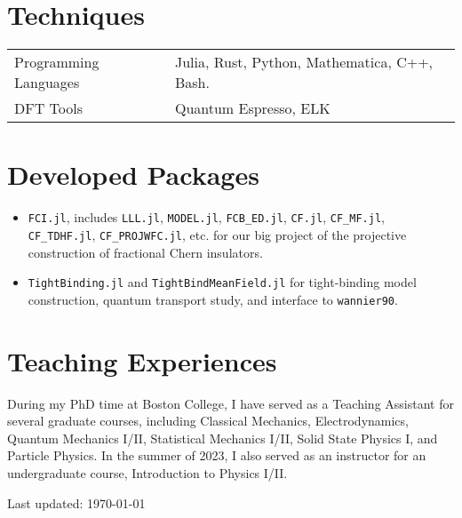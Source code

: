 \documentclass[10pt, letterpaper]{article}
\begin{document}
\section*{Techniques}
\begin{tabular}{ll}
    Programming Languages & Julia, Rust, Python, Mathematica, C++, Bash. \\
    DFT Tools             & Quantum Espresso, ELK                        \\
\end{tabular}

\section*{Developed Packages}
\begin{itemize}
    \item \texttt{FCI.jl}, includes \texttt{LLL.jl}, \texttt{MODEL.jl}, \texttt{FCB\_ED.jl}, \texttt{CF.jl}, \texttt{CF\_MF.jl}, \texttt{CF\_TDHF.jl}, \texttt{CF\_PROJWFC.jl}, etc. for our big project of the projective construction of fractional Chern insulators.
    \item \texttt{TightBinding.jl} and \texttt{TightBindMeanField.jl} for tight-binding model construction, quantum transport study, and interface to \texttt{wannier90}.
\end{itemize}



\section*{Teaching Experiences}
During my PhD time at Boston College, I have served as a Teaching Assistant for several graduate courses, including Classical Mechanics, Electrodynamics, Quantum Mechanics I/II, Statistical Mechanics I/II, Solid State Physics I, and Particle Physics. In the summer of 2023, I also served as an instructor for an undergraduate course, Introduction to Physics I/II.



\begin{center}
    \begin{footnotesize}
        Last updated: \today
    \end{footnotesize}
\end{center}
\end{document}
